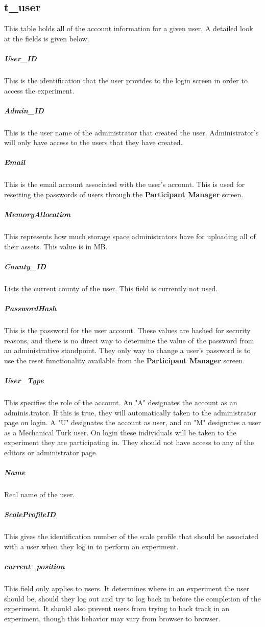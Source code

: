 \documentclass[article]{ij4uq}              %
\begin{document}
\subsection{t\_user}
This table holds all of the account information for a given user. A detailed look at the fields is given below.

\subparagraph{User\_ID}
This is the identification that the user provides to the login screen in order to access the experiment.

\subparagraph{Admin\_ID}
This is the user name of the administrator that created the user.  Administrator's will only have access to the users that they have created.

\subparagraph{Email}
This is the email account associated with the user's account.  This is used for resetting the passwords of users through the \textbf{Participant Manager} screen.

\subparagraph{MemoryAllocation}
This represents how much storage space administrators have for uploading all of their assets.  This value is in MB.

\subparagraph{County\_ID}
Lists the current county of the user. This field is currently not used. 

\subparagraph{PasswordHash}
This is the password for the user account.  These values are hashed for security reasons, and there is no direct way to determine the value of the password from an administrative standpoint.  They only way to change a user's password is to use the reset functionality available from the \textbf{Participant Manager} screen.

\subparagraph{User\_Type}
This specifies the role of the account. An "A" designates the account as an adminis.trator. If this is true, they will automatically taken to the administrator page on login. A "U" designates the account as user, and an "M" designates a user as a Mechanical Turk user. On login these individuals will be taken to the experiment they are participating in. They should not have access to any of the editors or administrator page. 

\subparagraph{Name}
Real name of the user. 

\subparagraph{ScaleProfileID}
This gives the identification number of the scale profile that should be associated with a user when they log in to perform an experiment.

\subparagraph{current\_position}
This field only applies to users. It determines where in an experiment the user should be, should they log out and try to log back in before the completion of the experiment. It should also prevent users from trying to back track in an experiment, though this behavior may vary from browser to browser. 
\end{document}
